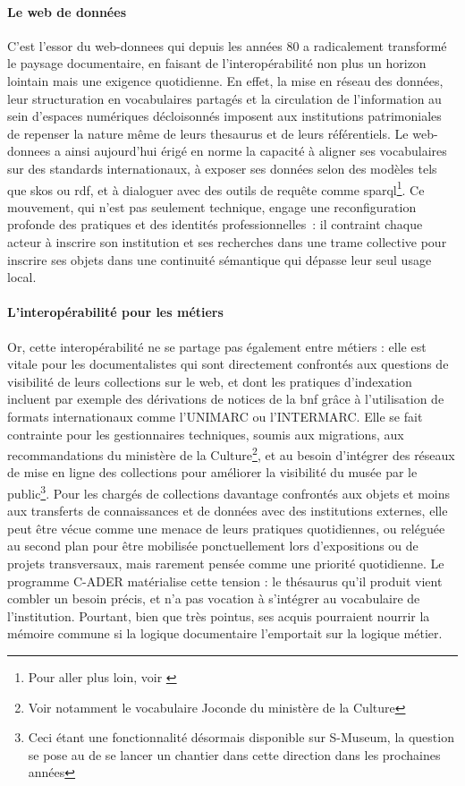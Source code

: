 \paragraph*{Le web de données}
C'est l'essor du \gls{web-donnees} qui depuis les années 80 a radicalement transformé le paysage documentaire, en faisant de l'interopérabilité non plus un horizon lointain mais une exigence quotidienne. En effet, la mise en réseau des données, leur structuration en vocabulaires partagés et la circulation de l'information au sein d'espaces numériques décloisonnés imposent aux institutions patrimoniales de repenser la nature même de leurs \gls{thesaurus} et de leurs référentiels. Le \gls{web-donnees} a ainsi aujourd'hui érigé en norme la capacité à aligner ses vocabulaires sur des standards internationaux, à exposer ses données selon des modèles tels que \gls{skos} ou \gls{rdf}, et à dialoguer avec des outils de requête comme \ac{sparql}\footnote{Pour aller plus loin, voir \cite{bermesVersNouveauxCatalogues2016, bermesCasLierDonnees2013a,lenartSKOSLangageRepresentation2007,perrinConsoliderEnrichirSes2020}}. Ce mouvement, qui n'est pas seulement technique, engage une reconfiguration profonde des pratiques et des identités professionnelles : il contraint chaque acteur à inscrire son institution et ses recherches dans une trame collective pour inscrire ses objets dans une continuité sémantique qui dépasse leur seul usage local.

\paragraph*{L'interopérabilité pour les métiers}
Or, cette interopérabilité ne se partage pas également entre métiers : elle est vitale pour les documentalistes qui sont directement confrontés aux questions de visibilité de leurs collections sur le web, et dont les pratiques d'indexation incluent par exemple des dérivations de notices de la \ac{bnf} grâce à l'utilisation de formats internationaux comme l'UNIMARC ou l'INTERMARC. Elle se fait contrainte pour les gestionnaires techniques, soumis aux migrations, aux recommandations du ministère de la Culture\footnote{Voir notamment le vocabulaire Joconde du ministère de la Culture}, et au besoin d’intégrer des réseaux de mise en ligne des collections pour améliorer la visibilité du musée par le public\footnote{Ceci étant une fonctionnalité désormais disponible sur S-Museum, la question se pose au \mae de se lancer un chantier dans cette direction dans les prochaines années}. Pour les chargés de collections davantage confrontés aux objets et moins aux transferts de connaissances et de données avec des institutions externes, elle peut être vécue comme une menace de leurs pratiques quotidiennes, ou reléguée au second plan pour être mobilisée ponctuellement lors d’expositions ou de projets transversaux, mais rarement pensée comme une priorité quotidienne. Le programme C-ADER matérialise cette tension : le thésaurus qu’il produit vient combler un besoin précis, et n’a pas vocation à s’intégrer au vocabulaire de l'institution. Pourtant, bien que très pointus, ses acquis pourraient nourrir la mémoire commune si la logique documentaire l’emportait sur la logique métier.

